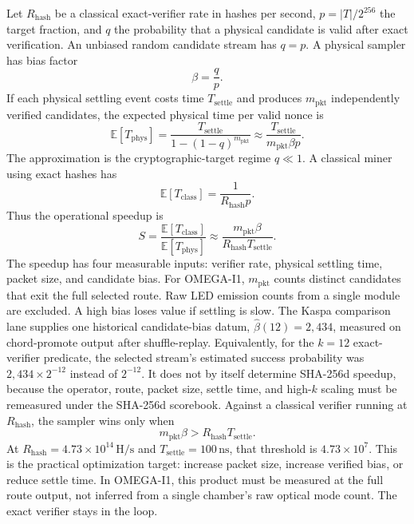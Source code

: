 \documentclass[11pt]{article}
\theoremstyle{definition}
\theoremstyle{remark}
\begin{document}
Let \(R_{\mathrm{hash}}\) be a classical exact-verifier rate in hashes per
second, \(p=|T|/2^{256}\) the target fraction, and \(q\) the probability that a
physical candidate is valid after exact verification. An unbiased random
candidate stream has \(q=p\). A physical sampler has bias factor
\[
\beta=\frac{q}{p}.
\]
If each physical settling event costs time \(T_{\mathrm{settle}}\) and produces
\(m_{\mathrm{pkt}}\) independently verified candidates, the expected physical
time per valid nonce is
\[
\mathbb E[T_{\mathrm{phys}}]
=\frac{T_{\mathrm{settle}}}{1-(1-q)^{m_{\mathrm{pkt}}}}
\approx\frac{T_{\mathrm{settle}}}{m_{\mathrm{pkt}}\beta p}.
\]
The approximation is the cryptographic-target regime \(q\ll1\).
A classical miner using exact hashes has
\[
\mathbb E[T_{\mathrm{class}}]=\frac{1}{R_{\mathrm{hash}}p}.
\]
Thus the operational speedup is
\[
S=\frac{\mathbb E[T_{\mathrm{class}}]}{\mathbb E[T_{\mathrm{phys}}]}
\approx\frac{m_{\mathrm{pkt}}\beta}{R_{\mathrm{hash}}T_{\mathrm{settle}}}.
\]
The speedup has four measurable inputs: verifier rate, physical settling time,
packet size, and candidate bias. For OMEGA-I1, \(m_{\mathrm{pkt}}\) counts
distinct candidates that exit the full selected route. Raw LED emission counts
from a single module are excluded. A high bias loses value if settling is slow.
The Kaspa comparison lane supplies one historical candidate-bias datum,
\(\widehat\beta(12)=2{,}434\), measured on chord-promote output after
shuffle-replay. Equivalently, for the \(k=12\) exact-verifier predicate,
the selected stream's estimated success probability was \(2{,}434\times2^{-12}\)
instead of \(2^{-12}\). It does not by itself determine SHA-256d speedup,
because the operator, route, packet size, settle time, and high-\(k\) scaling
must be remeasured under the SHA-256d scorebook.
Against a classical verifier running at \(R_{\mathrm{hash}}\), the sampler wins
only when
\[
m_{\mathrm{pkt}}\beta>R_{\mathrm{hash}}T_{\mathrm{settle}}.
\]
At \(R_{\mathrm{hash}}=4.73\times10^{14}\,\mathrm{H/s}\) and
\(T_{\mathrm{settle}}=100\,\mathrm{ns}\), that threshold is
\(4.73\times10^7\). This is the practical optimization target: increase packet
size, increase verified bias, or reduce settle time. In OMEGA-I1, this product
must be measured at the full route output, not inferred from a single chamber's
raw optical mode count. The exact verifier stays in the loop.
\end{document}
